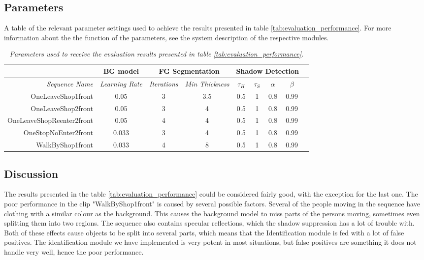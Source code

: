 \subsection{Parameters}
A table of the relevant parameter settings used to achieve the results presented in table \ref{tab:evaluation_performance}. For more information about the the function of the parameters, see the system description of the respective modules.
\begin{table}[h]
\centering
	\begin{tabular}{r | c || c | c || c | c | c | c | c }
	&	\multicolumn{1}{|c||}{BG model} & \multicolumn{2}{c||}{FG Segmentation} & \multicolumn{4}{c|}{Shadow Detection} \\
		\hline
		\emph{Sequence Name} & \emph{Learning Rate} & \emph{Iterations} & \emph{Min Thickness} &\emph{$\tau_H$} & \emph{$\tau_S$} & \emph{$\alpha$} & \emph{$\beta$}\\ 
		\hline \hline
		OneLeaveShop1front			& 0.05 		& 3 & 3.5 	& 0.5 & 1 & 0.8 & 0.99\\
		OneLeaveShop2front			& 0.05 		& 3 & 4 	& 0.5 & 1 & 0.8 & 0.99\\
		OneLeaveShopReenter2front	& 0.05		& 4 & 4 	& 0.5 & 1 & 0.8 & 0.99\\
		OneStopNoEnter2front 		& 0.033		& 3 & 4 	& 0.5 & 1 & 0.8 & 0.99\\
		WalkByShop1front 			& 0.033 	& 4 & 8 	& 0.5 & 1 & 0.8 & 0.99\\
	\end{tabular}
	\caption{\textit{Parameters used to receive the evaluation results presented in table \ref{tab:evaluation_performance}.}}
	\label{tab:evaluation_parameters}
\end{table}

\subsection{Discussion}
The results presented in the table \ref{tab:evaluation_performance} could be considered fairly good, with the exception for the last one. The poor performance in the clip "WalkByShop1front" is caused by several possible factors. Several of the people moving in the sequence have clothing with a similar colour as the background. This causes the background model to miss parts of the persons moving, sometimes even splitting them into two regions. The sequence also contains specular reflections, which the shadow suppression has a lot of trouble with. Both of these effects cause objects to be split into several parts, which means that the Identification module is fed with a lot of false positives. The identification module we have implemented is very potent in most situations, but false positives are something it does not handle very well, hence the poor performance.



